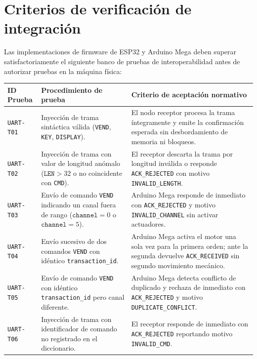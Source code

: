 \documentclass[a4paper,11pt]{article}
\newcommand{\tablehead}[1]{\cellcolor{SAIDBlue}\color{white}\textbf{#1}}
\begin{document}
\clearpage
\section{Criterios de verificación de integración}

Las implementaciones de firmware de ESP32 y Arduino Mega deben superar
satisfactoriamente el siguiente banco de pruebas de interoperabilidad antes de
autorizar pruebas en la máquina física:

\noindent\begin{xltabular}{\textwidth}{|p{2.0cm}|p{6.0cm}|X|}
    \hline
    \tablehead{ID Prueba} & \tablehead{Procedimiento de prueba} & \tablehead{Criterio de aceptación normativo} \\
    \hline \endhead

    \texttt{UART-T01} & Inyección de trama sintáctica válida (\texttt{VEND}, \texttt{KEY}, \texttt{DISPLAY}). & El nodo receptor procesa la trama íntegramente y emite la confirmación esperada sin desbordamiento de memoria ni bloqueos. \\
    \hline
    \texttt{UART-T02} & Inyección de trama con valor de longitud anómalo ($\texttt{LEN} > 32$ o no coincidente con \texttt{CMD}). & El receptor descarta la trama por longitud inválida o responde \texttt{ACK\_REJECTED} con motivo \texttt{INVALID\_LENGTH}. \\
    \hline
    \texttt{UART-T03} & Envío de comando \texttt{VEND} indicando un canal fuera de rango ($\texttt{channel} = 0$ o $\texttt{channel} = 5$). & Arduino Mega responde de inmediato con \texttt{ACK\_REJECTED} y motivo \texttt{INVALID\_CHANNEL} sin activar actuadores. \\
    \hline
    \texttt{UART-T04} & Envío sucesivo de dos comandos \texttt{VEND} con idéntico \texttt{transaction\_id}. & Arduino Mega activa el motor una sola vez para la primera orden; ante la segunda devuelve \texttt{ACK\_RECEIVED} sin segundo movimiento mecánico. \\
    \hline
    \texttt{UART-T05} & Envío de comando \texttt{VEND} con idéntico \texttt{transaction\_id} pero canal diferente. & Arduino Mega detecta conflicto de duplicado y rechaza de inmediato con \texttt{ACK\_REJECTED} y motivo \texttt{DUPLICATE\_CONFLICT}. \\
    \hline
    \texttt{UART-T06} & Inyección de trama con identificador de comando no registrado en el diccionario. & El receptor responde de inmediato con \texttt{ACK\_REJECTED} reportando motivo \texttt{INVALID\_CMD}. \\
    \hline
\end{xltabular}
\end{document}
